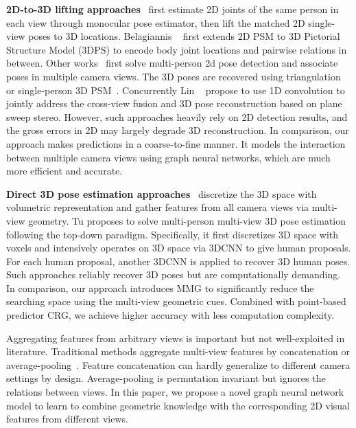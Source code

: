 \documentclass[10pt,twocolumn,letterpaper]{article}
\begin{document}
\textbf{2D-to-3D lifting approaches}~\cite{amin2013multi,belagiannis20143d,belagiannis20153d,bridgeman2019multi,dong2019fast,ershadi2018multiple} first estimate 2D joints of the same person in each view through monocular pose estimator, then lift the matched 2D single-view poses to 3D locations. Belagiannis \etal~\cite{belagiannis20143d,belagiannis20153d} first extends 2D PSM to 3D Pictorial Structure Model (3DPS) to encode body joint locations and pairwise relations in between. Other works~\cite{bridgeman2019multi,huang2020end} first solve multi-person 2d pose detection and associate poses in multiple camera views. The 3D poses are recovered using triangulation~\cite{bridgeman2019multi} or single-person 3D PSM~\cite{dong2019fast}. Concurrently Lin \etal~\cite{lin2021multi} propose to use 1D convolution to jointly
address the cross-view fusion and 3D pose reconstruction based on plane sweep stereo. However, such approaches heavily rely on 2D detection results, and the gross errors in 2D may largely degrade 3D reconstruction. In comparison, our approach makes predictions in a coarse-to-fine manner. It models the interaction between multiple camera views using graph neural networks, which are much more efficient and accurate. 

\textbf{Direct 3D pose estimation approaches}~\cite{tu2020voxelpose} discretize the 3D space with volumetric representation and gather features from all camera views via multi-view geometry. Tu \etal proposes to solve multi-person multi-view 3D pose estimation following the top-down paradigm. Specifically, it first discretizes 3D space with voxels and intensively operates on 3D space via 3DCNN to give human proposals. For each human proposal, another 3DCNN is applied to recover 3D human poses. Such approaches reliably recover 3D poses but are computationally demanding. In comparison, our approach introduces MMG to significantly reduce the searching space using the multi-view geometric cues. Combined with point-based predictor CRG, we achieve higher accuracy with less computation complexity. 

Aggregating features from arbitrary views is important but not well-exploited in literature. Traditional methods aggregate multi-view features by concatenation or average-pooling~\cite{tu2020voxelpose}. Feature concatenation can hardly generalize to different camera settings by design. Average-pooling is permutation invariant but ignores the relations between views. In this paper, we propose a novel graph neural network model to learn to combine geometric knowledge with the corresponding 2D visual features from different views.
\end{document}
